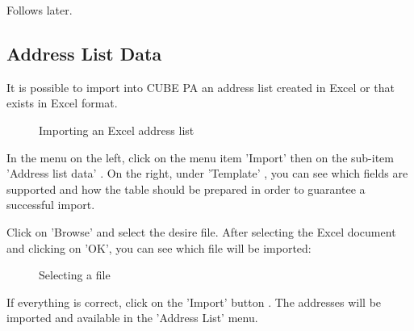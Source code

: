 Follows later.

\subsection{Address List Data}

It is possible to import into CUBE PA an address list created in Excel or that exists in Excel format. 

\begin{figure}[H]
\caption{Importing an Excel address list}
\end{figure}

In the menu on the left, click on the menu item 'Import' then on the sub-item 'Address list data' . On the right, under 'Template' , you can see which fields are supported and how the table should be prepared in order to guarantee a successful import.

\vspace{\baselineskip}

Click on 'Browse'  and select the desire file. After selecting the Excel document and clicking on 'OK', you can see which file will be imported:

\begin{figure}[H]
\caption{Selecting a file}
\end{figure}

If everything is correct, click on the 'Import' button . The addresses will be imported and available in the 'Address List' menu. 

